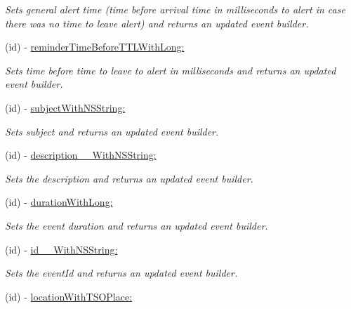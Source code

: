 \begin{DoxyCompactItemize}
\begin{DoxyCompactList}\small\item\em Sets general alert time (time before arrival time in milliseconds to alert in case there was no time to leave alert) and returns an updated event builder. \end{DoxyCompactList}\item 
(id) -\/ \hyperlink{interface_base_event___base_event_builder_ad303b818e7095ee297c37a6f92047b26}{reminder\+Time\+Before\+T\+T\+L\+With\+Long\+:}
\begin{DoxyCompactList}\small\item\em Sets time before time to leave to alert in milliseconds and returns an updated event builder. \end{DoxyCompactList}\item 
(id) -\/ \hyperlink{interface_base_event___base_event_builder_aebb7add063707ccee6b72a7335f43bfc}{subject\+With\+N\+S\+String\+:}
\begin{DoxyCompactList}\small\item\em Sets subject and returns an updated event builder. \end{DoxyCompactList}\item 
(id) -\/ \hyperlink{interface_base_event___base_event_builder_adb2dce656e5fea3e9d568b749e0bae9e}{description\+\_\+\+\_\+\+With\+N\+S\+String\+:}
\begin{DoxyCompactList}\small\item\em Sets the description and returns an updated event builder. \end{DoxyCompactList}\item 
(id) -\/ \hyperlink{interface_base_event___base_event_builder_a39e94969fa278c0009e245c08288d8a2}{duration\+With\+Long\+:}
\begin{DoxyCompactList}\small\item\em Sets the event duration and returns an updated event builder. \end{DoxyCompactList}\item 
(id) -\/ \hyperlink{interface_base_event___base_event_builder_a6c9f6755eb68fe7581322e474b187204}{id\+\_\+\+\_\+\+With\+N\+S\+String\+:}
\begin{DoxyCompactList}\small\item\em Sets the event\+Id and returns an updated event builder. \end{DoxyCompactList}\item 
(id) -\/ \hyperlink{interface_base_event___base_event_builder_aa71ebb7cf3289d77be2d46d4a6f55fa1}{location\+With\+T\+S\+O\+Place\+:}

\end{DoxyCompactItemize}
